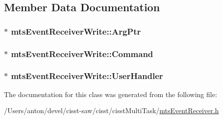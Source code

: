 \subsection{Member Data Documentation}
\hypertarget{classmts_event_receiver_write_ac001e32506dc7feb428a18ae7d80bbe8}{}
\subsubsection[{Arg\+Ptr}]{$\ast$ mts\+Event\+Receiver\+Write\+::\+Arg\+Ptr\hspace{0.3cm}{\ttfamily [protected]}}\label{classmts_event_receiver_write_ac001e32506dc7feb428a18ae7d80bbe8}
\hypertarget{classmts_event_receiver_write_a60b0cbe48b277b5130576c5009b8851e}{}
\subsubsection[{Command}]{$\ast$ mts\+Event\+Receiver\+Write\+::\+Command\hspace{0.3cm}{\ttfamily [protected]}}\label{classmts_event_receiver_write_a60b0cbe48b277b5130576c5009b8851e}
\hypertarget{classmts_event_receiver_write_a9ad8837c3e250203c0b0e8ce4112024d}{}
\subsubsection[{User\+Handler}]{$\ast$ mts\+Event\+Receiver\+Write\+::\+User\+Handler\hspace{0.3cm}{\ttfamily [protected]}}\label{classmts_event_receiver_write_a9ad8837c3e250203c0b0e8ce4112024d}


The documentation for this class was generated from the following file\+:\begin{DoxyCompactItemize}
\item 
/\+Users/anton/devel/cisst-\/saw/cisst/cisst\+Multi\+Task/\hyperlink{mts_event_receiver_8h}{mts\+Event\+Receiver.\+h}\end{DoxyCompactItemize}

